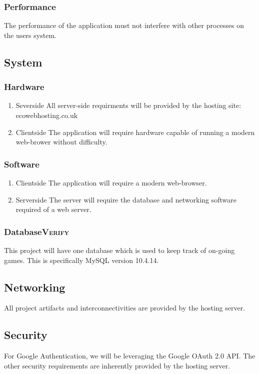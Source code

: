 \documentclass[11pt]{article}
\begin{document}
\subsubsection{Performance}
\label{sec:orgddb15e1}
The performance of the application must not interfere with other
processes on the users system.
\subsection{System}
\label{sec:orgdcb21bd}
\subsubsection{Hardware}
\label{sec:org6240ca5}
\begin{enumerate}
\item Severside
\label{sec:orgeb3c242}
All server-side requirments will be provided by the hosting site: ecowebhosting.co.uk
\item Clientside
\label{sec:org1d5e484}
The application will require hardware capable of running a modern web-brower without difficulty.
\end{enumerate}
\subsubsection{Software}
\label{sec:org728b681}
\begin{enumerate}
\item Clientside
\label{sec:orgdab2f2b}
The application will require a modern web-browser.
\item Serverside
\label{sec:org8274907}
The server will require the database and networking software required of a web server.
\end{enumerate}
\subsubsection{Database\hfill{}\textsc{Verify}}
\label{sec:org39be0b9}
This project will have one database which is used to keep track of
on-going games. This is specifically MySQL version 10.4.14.

\subsection{Networking}
\label{sec:orgb04e917}
All project artifacts and interconnectivities are provided by the
hosting server.
\subsection{Security}
\label{sec:org4c0b90c}
For Google Authentication, we will be leveraging the Google OAuth
2.0 API. The other security requirements are inherently provided by
the hosting server.
\end{document}

